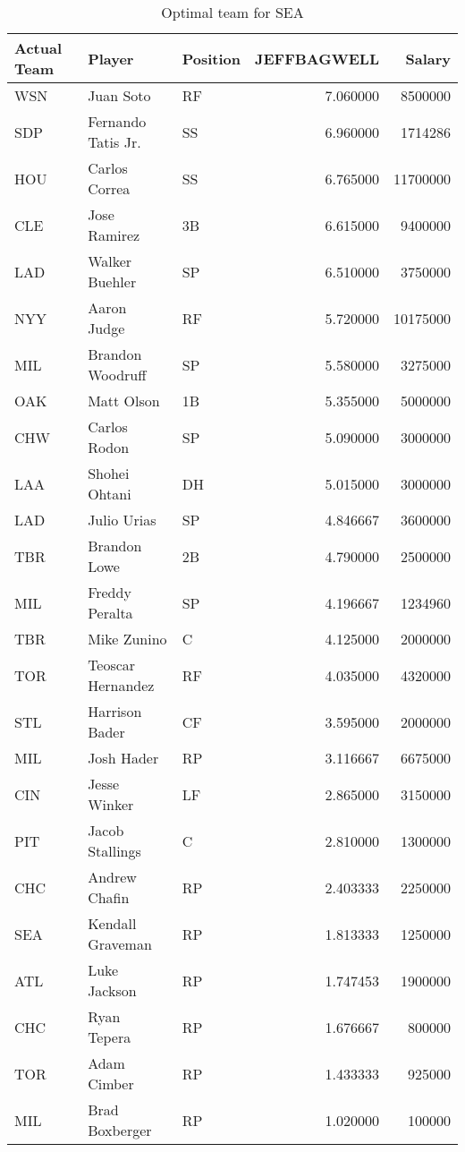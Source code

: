 \begin{table}

\caption{Optimal team for SEA}
\centering
\begin{tabular}[t]{l|l|l|r|r}
\hline
Actual Team & Player & Position & JEFFBAGWELL & Salary\\
\hline
WSN & Juan Soto & RF & 7.060000 & 8500000\\
\hline
SDP & Fernando Tatis Jr. & SS & 6.960000 & 1714286\\
\hline
HOU & Carlos Correa & SS & 6.765000 & 11700000\\
\hline
CLE & Jose Ramirez & 3B & 6.615000 & 9400000\\
\hline
LAD & Walker Buehler & SP & 6.510000 & 3750000\\
\hline
NYY & Aaron Judge & RF & 5.720000 & 10175000\\
\hline
MIL & Brandon Woodruff & SP & 5.580000 & 3275000\\
\hline
OAK & Matt Olson & 1B & 5.355000 & 5000000\\
\hline
CHW & Carlos Rodon & SP & 5.090000 & 3000000\\
\hline
LAA & Shohei Ohtani & DH & 5.015000 & 3000000\\
\hline
LAD & Julio Urias & SP & 4.846667 & 3600000\\
\hline
TBR & Brandon Lowe & 2B & 4.790000 & 2500000\\
\hline
MIL & Freddy Peralta & SP & 4.196667 & 1234960\\
\hline
TBR & Mike Zunino & C & 4.125000 & 2000000\\
\hline
TOR & Teoscar Hernandez & RF & 4.035000 & 4320000\\
\hline
STL & Harrison Bader & CF & 3.595000 & 2000000\\
\hline
MIL & Josh Hader & RP & 3.116667 & 6675000\\
\hline
CIN & Jesse Winker & LF & 2.865000 & 3150000\\
\hline
PIT & Jacob Stallings & C & 2.810000 & 1300000\\
\hline
CHC & Andrew Chafin & RP & 2.403333 & 2250000\\
\hline
SEA & Kendall Graveman & RP & 1.813333 & 1250000\\
\hline
ATL & Luke Jackson & RP & 1.747453 & 1900000\\
\hline
CHC & Ryan Tepera & RP & 1.676667 & 800000\\
\hline
TOR & Adam Cimber & RP & 1.433333 & 925000\\
\hline
MIL & Brad Boxberger & RP & 1.020000 & 100000\\
\hline
\end{tabular}
\end{table}
